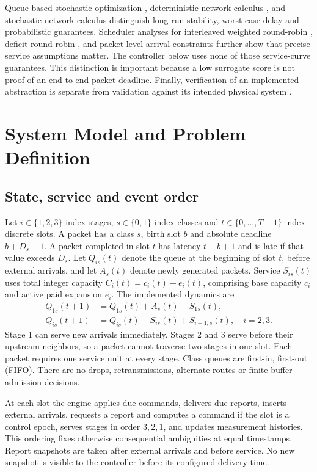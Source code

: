 \documentclass[10pt,a4paper]{article}
\begin{document}
Queue-based stochastic optimization \cite{neely}, deterministic network calculus
\cite{netcalc}, and stochastic network calculus \cite{stochcalc} distinguish
long-run stability, worst-case delay and probabilistic guarantees. Scheduler
analyses for interleaved weighted round-robin \cite{iwrr}, deficit round-robin
\cite{drr}, and packet-level arrival constraints \cite{packetbounds} further
show that precise service assumptions matter. The controller below uses none
of those service-curve guarantees. This distinction is important because a low
surrogate score is not proof of an end-to-end packet deadline. Finally,
verification of an implemented abstraction is separate from validation against
its intended physical system \cite{sargent}.

\section{System Model and Problem Definition}
\subsection{State, service and event order}
Let $i\in\{1,2,3\}$ index stages, $s\in\{0,1\}$ index classes and
$t\in\{0,\ldots,T-1\}$ index discrete slots. A packet has a class $s$, birth
slot $b$ and absolute deadline $b+D_s-1$. A packet completed in slot $t$ has
latency $t-b+1$ and is late if that value exceeds $D_s$.
Let $Q_{is}(t)$ denote the queue at the beginning of slot $t$, before external
arrivals, and let $A_s(t)$ denote newly generated packets. Service $S_{is}(t)$
uses total integer capacity $C_i(t)=c_i(t)+e_i(t)$, comprising base capacity
$c_i$ and active paid expansion $e_i$. The implemented dynamics are
\begin{align}
 Q_{1s}(t+1)&=Q_{1s}(t)+A_s(t)-S_{1s}(t),\label{eq:q1}\\
 Q_{is}(t+1)&=Q_{is}(t)-S_{is}(t)+S_{i-1,s}(t),\quad i=2,3.\label{eq:qi}
\end{align}
Stage 1 can serve new arrivals immediately. Stages 2 and 3 serve before their
upstream neighbors, so a packet cannot traverse two stages in one slot.
Each packet requires one service unit at every stage. Class queues are first-in,
first-out (FIFO). There are no drops, retransmissions, alternate routes or
finite-buffer admission decisions.

At each slot the engine applies due commands, delivers due reports, inserts
external arrivals, requests a report and computes a command if the slot is a
control epoch, serves stages in order $3,2,1$, and updates measurement histories.
This ordering fixes otherwise consequential ambiguities at equal timestamps.
Report snapshots are taken after external arrivals and before service.
No new snapshot is visible to the controller before its configured delivery time.
\end{document}
